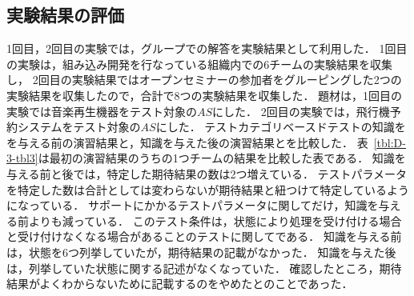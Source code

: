 \subsection{実験結果の評価}
1回目，2回目の実験では，グループでの解答を実験結果として利用した．
1回目の実験は，組み込み開発を行なっている組織内での6チームの実験結果を収集し，
2回目の実験結果ではオープンセミナーの参加者をグルーピングした2つの実験結果を収集したので，合計で8つの実験結果を収集した．
題材は，1回目の実験では音楽再生機器をテスト対象の$AS$にした．
2回目の実験では，飛行機予約システムをテスト対象の$AS$にした．
テストカテゴリベースドテストの知識をを与える前の演習結果と，知識を与えた後の演習結果とを比較した．
表~\ref{tbl:D-3-tbl3}は最初の演習結果のうちの1つチームの結果を比較した表である．
知識を与える前と後では，特定した期待結果の数は2つ増えている．
テストパラメータを特定した数は合計としては変わらないが期待結果と紐つけて特定しているようになっている．
サポートにかかるテストパラメータに関してだけ，知識を与える前よりも減っている．
このテスト条件は，状態により処理を受け付ける場合と受け付けなくなる場合があることのテストに関してである．
知識を与える前は，状態を6つ列挙していたが，期待結果の記載がなかった．
知識を与えた後は，列挙していた状態に関する記述がなくなっていた．
確認したところ，期待結果がよくわからないために記載するのをやめたとのことであった．

